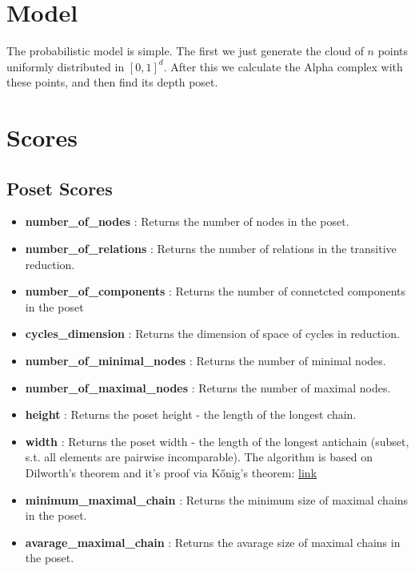 \documentclass{article}
\begin{document}
\section{Model}
\par The probabilistic model is simple. The first we just generate the cloud of $n$ points uniformly distributed in $[0, 1]^d$. After this we calculate the Alpha complex with these points, and then find its depth poset.

\section{Scores}
\subsection{Poset Scores}
\begin{itemize}
\item \textbf{number\_of\_nodes }: Returns the number of nodes in the poset.
\item \textbf{number\_of\_relations }: Returns the number of relations in the transitive reduction.
\item \textbf{number\_of\_components }: Returns the number of connetcted components in the poset
\item \textbf{cycles\_dimension }: Returns the dimension of space of cycles in reduction.
\item \textbf{number\_of\_minimal\_nodes }: Returns the number of minimal nodes.
\item \textbf{number\_of\_maximal\_nodes }: Returns the number of maximal nodes.
\item \textbf{height }: Returns the poset height - the length of the longest chain.
\item \textbf{width }: Returns the poset width - the length of the longest antichain (subset, s.t. all elements are pairwise incomparable).
    The algorithm is based on Dilworth's theorem and it's proof via Kőnig's theorem:
    \href{https://en.wikipedia.org/wiki/Dilworth%27s_theorem}{link}
\item \textbf{minimum\_maximal\_chain }: Returns the minimum size of maximal chains in the poset.
\item \textbf{avarage\_maximal\_chain }: Returns the avarage size of maximal chains in the poset.
\end{itemize}
\end{document}

